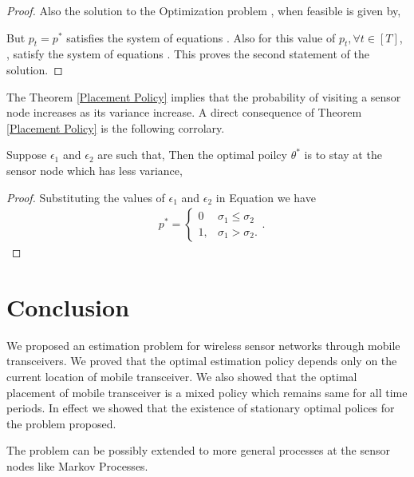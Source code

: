 \documentclass[a4paper,english,12pt]{article}
\begin{document}
\begin{proof}
  Also the solution to the Optimization problem , when feasible is given by,
    
  But $p_t=p^*$ satisfies the system of equations . Also for this value of $p_t, \forall t \in [T]$,  , satisfy the system of equations . 
    This proves the second statement of the solution.
  
  
  \end{proof}


The Theorem \ref{Placement  Policy} implies that the probability of visiting a sensor node increases as its variance increase. A direct consequence of Theorem \ref{Placement Policy} is the following corrolary.

\begin{cor}
Suppose $\epsilon_1$ and $\epsilon_2$ are such that, 
Then the optimal poilcy $\theta^*$ is to stay at the sensor node which has less variance,


\end{cor}
\begin{proof}
Substituting the values of $\epsilon_1$ and $\epsilon_2$ in Equation  we have \begin{align}
    & p^* =\begin{cases}
      0 & \sigma_1 \leq \sigma_2\\
     1, &  \sigma_1 > \sigma_2.
    \end{cases}.
    \end{align}
    

\end{proof}

\section{Conclusion}
We proposed an estimation problem for wireless sensor networks through mobile transceivers. We proved that the optimal estimation policy depends only on the current location of mobile transceiver. We also showed that the optimal placement of mobile transceiver is a mixed policy which remains same for all time periods. In effect we showed that the existence of stationary optimal polices for the problem proposed.


The problem can be possibly extended to more general processes at the sensor nodes like Markov Processes.





\end{document}
